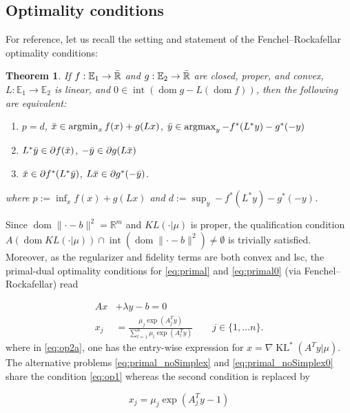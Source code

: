 \documentclass[10pt,a4paper]{article}
\numberwithin{equation}{section}
\newtheorem{theorem}{Theorem}[section]
\theoremstyle{definition}
\def\rr{{\mathbb R}}
\def\ee{{\mathbb E}}
\DeclareMathOperator{\argmax}{argmax}
\DeclareMathOperator{\interior}{int}
\DeclareMathOperator{\argmin}{argmin}
\DeclareMathOperator{\dom}{dom}
\DeclareMathOperator{\KL}{KL}
\begin{document}
\subsection{Optimality conditions}

For reference, let us recall the setting and statement of the Fenchel--Rockafellar optimality conditions:

\begin{theorem} If $f: \ee_1 \to \Bar{\rr}$ and $g:\ee_2 \to \Bar{\rr}$ are closed, proper, and convex, $L: \ee_1 \to \ee_2$ is linear, and $0 \in \interior (\dom g - L(\dom f))$, then the following are equivalent:
\begin{enumerate}
    \item $p = d$, $\Bar{x} \in \argmin_x f(x) + g(Lx)$, $\Bar{y} 
    \in \argmax_y - f^\ast(L^\ast y) - g^\ast(-y)$
    \item $L^\ast\Bar{y} \in \partial f(\Bar{x})$, $-\Bar{y} \in \partial g(L\Bar{x})$
    \item $\Bar{x} \in \partial f^\ast(L^\ast\Bar{y})$, $L\Bar{x} \in \partial g^\ast (-\Bar{y})$.
\end{enumerate}
where $p := \inf_x f(x) + g(Lx)$ and $d := \sup_y - f^\ast(L^\ast y) - g^\ast(-y)$.
    
\end{theorem}


Since $\dom \lVert \cdot - b \rVert^2 = \rr^m$ and $KL(\cdot|\mu)$ is proper, the qualification condition $A(\dom KL(\cdot |\mu)) \cap \interior (\dom \lVert \cdot - b \rVert^2) \neq \emptyset$ is trivially satisfied. Moreover, as the regularizer and fidelity terms are both convex and lsc, the primal-dual optimality conditions for \eqref{eq:primal} and \eqref{eq:primal0} (via Fenchel--Rockafellar) read

\begin{align}
    Ax &+ \lambda y - b = 0 \label{eq:op1}\\
    x_j &= \frac{\mu_j \exp(A_j^Ty)}{\sum_{l=1}^n \mu_l \exp(A_l^Ty)} \qquad j \in \{1, \dots n\}. \label{eq:op2a}
\end{align}
where in \eqref{eq:op2a}, one has the entry-wise expression for $x = \nabla \KL^\ast(A^Ty|\mu)$.
The alternative problems  \eqref{eq:primal_noSimplex} and \eqref{eq:primal_noSimplex0} share the condition \eqref{eq:op1} whereas the second condition is replaced by

\begin{equation}\label{eq:op2_noSimplex}
     x_j = \mu_j \exp(A_j^Ty - 1)
\end{equation}
\end{document}
